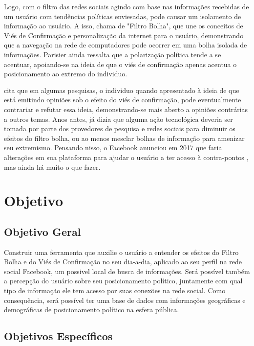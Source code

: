 \documentclass[
	12pt,				%
	oneside,			%
	a4paper,			%
	english,			%
	brazil				%
	]{abntex2ppgsi}
\begin{document}
Logo, com o filtro das redes sociais agindo com base nas informações recebidas de um usuário com tendências políticas enviesadas, pode causar um isolamento de informação ao usuário. A isso,  chama de "Filtro Bolha", que une os conceitos de Viés de Confirmação e personalização da internet para o usuário, demonstrando que a navegação na rede de computadores pode ocorrer em uma bolha isolada de informações. Parisier ainda ressalta que a polarização política tende a se acentuar, apoiando-se na ideia de que o viés de confirmação apenas acentua o posicionamento ao extremo do individuo. 

 cita que em algumas pesquisas, o individuo quando apresentado à ideia de que está emitindo opiniões sob o efeito do viés de confirmação, pode eventualmente contrariar e refutar essa ideia, demonstrando-se mais aberto a opiniões contrárias a outros temas. Anos antes,  já dizia que alguma ação tecnológica deveria ser tomada por parte dos provedores de pesquisa e redes sociais para diminuir os efeitos do filtro bolha, ou ao menos mesclar bolhas de informação para amenizar seu extremismo. Pensando nisso, o Facebook anunciou em 2017 que faria alterações em sua plataforma para ajudar o usuário a ter acesso à contra-pontos \cite{facebook_related}, mas ainda há muito o que fazer.


\chapter{Objetivo}
\section{Objetivo Geral}

Construir uma ferramenta que auxilie o usuário a entender os efeitos do Filtro Bolha e do Viés de Confirmação no seu dia-a-dia, aplicado ao seu perfil na rede social Facebook, um possivel local de busca de informações. Será possível também a percepção do usuário sobre seu posicionamento político, juntamente com qual tipo de informação ele tem acesso por suas conexões na rede social. Como consequência, será possível ter uma base de dados com informações geográficas e demográficas de posicionamento político na esfera pública. 


\section{Objetivos Específicos}
\end{document}

